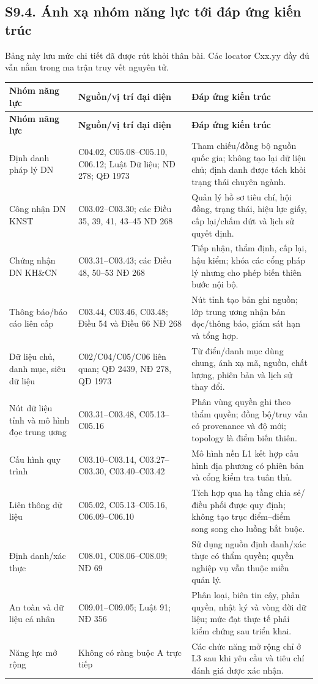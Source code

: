 \documentclass[a4paper,11pt]{article}
\begin{document}
\subsection*{S9.4. Ánh xạ nhóm năng lực tới đáp ứng kiến trúc}
Bảng này lưu mức chi tiết đã được rút khỏi thân bài. Các locator Cxx.yy đầy đủ vẫn nằm trong ma trận truy vết nguyên tử.

\small
\renewcommand{\arraystretch}{1.02}
\setlength{\tabcolsep}{2.4pt}
\begin{longtable}{@{}p{3.0cm}p{5.0cm}p{6.5cm}@{}}
\toprule
\textbf{Nhóm năng lực} & \textbf{Nguồn/vị trí đại diện} & \textbf{Đáp ứng kiến trúc} \\
\midrule
\endfirsthead
\toprule
\textbf{Nhóm năng lực} & \textbf{Nguồn/vị trí đại diện} & \textbf{Đáp ứng kiến trúc} \\
\midrule
\endhead
\bottomrule
\endfoot
Định danh pháp lý DN & C04.02, C05.08--C05.10, C06.12; Luật Dữ liệu; NĐ 278; QĐ 1973 & Tham chiếu/đồng bộ nguồn quốc gia; không tạo lại dữ liệu chủ; định danh được tách khỏi trạng thái chuyên ngành. \\
Công nhận DN KNST & C03.02--C03.30; các Điều 35, 39, 41, 43--45 NĐ 268 & Quản lý hồ sơ tiêu chí, hội đồng, trạng thái, hiệu lực giấy, cấp lại/chấm dứt và lịch sử quyết định. \\
Chứng nhận DN KH\&CN & C03.31--C03.43; các Điều 48, 50--53 NĐ 268 & Tiếp nhận, thẩm định, cấp lại, hậu kiểm; khóa các cổng pháp lý nhưng cho phép biến thiên bước nội bộ. \\
Thông báo/báo cáo liên cấp & C03.44, C03.46, C03.48; Điều 54 và Điều 66 NĐ 268 & Nút tỉnh tạo bản ghi nguồn; lớp trung ương nhận bản đọc/thông báo, giám sát hạn và tổng hợp. \\
Dữ liệu chủ, danh mục, siêu dữ liệu & C02/C04/C05/C06 liên quan; QĐ 2439, NĐ 278, QĐ 1973 & Từ điển/danh mục dùng chung, ánh xạ mã, nguồn, chất lượng, phiên bản và lịch sử thay đổi. \\
Nút dữ liệu tỉnh và mô hình đọc trung ương & C03.31--C03.48, C05.13--C05.16 & Phân vùng quyền ghi theo thẩm quyền; đồng bộ/truy vấn có provenance và độ mới; topology là điểm biến thiên. \\
Cấu hình quy trình & C03.10--C03.14, C03.27--C03.30, C03.40--C03.42 & Mô hình nền L1 kết hợp cấu hình địa phương có phiên bản và cổng kiểm tra tuân thủ. \\
Liên thông dữ liệu & C05.02, C05.13--C05.16, C06.09--C06.10 & Tích hợp qua hạ tầng chia sẻ/điều phối được quy định; không tạo trục điểm--điểm song song cho luồng bắt buộc. \\
Định danh/xác thực & C08.01, C08.06--C08.09; NĐ 69 & Sử dụng nguồn định danh/xác thực có thẩm quyền; quyền nghiệp vụ vẫn thuộc miền quản lý. \\
An toàn và dữ liệu cá nhân & C09.01--C09.05; Luật 91; NĐ 356 & Phân loại, biên tin cậy, phân quyền, nhật ký và vòng đời dữ liệu; mức đạt thực tế phải kiểm chứng sau triển khai. \\
Năng lực mở rộng & Không có ràng buộc A trực tiếp & Các chức năng mở rộng chỉ ở L3 sau khi yêu cầu và tiêu chí đánh giá được xác nhận. \\
\end{longtable}
\normalsize
\end{document}
